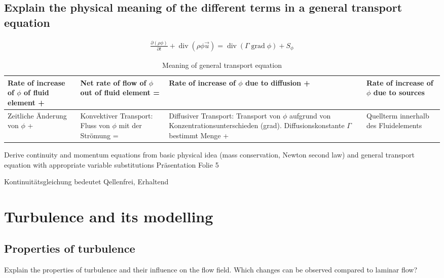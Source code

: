 \documentclass[a4paper]{scrartcl}
\begin{document}
\subsection{Explain the physical meaning of the different terms in a general
transport equation}

\begin{align}
\frac{\partial(\rho \phi)}{\partial t} + \operatorname{div}(\rho\phi\vec
u)=\operatorname{div}(\Gamma \operatorname{grad} \phi) + S_\phi
\end{align}

\begin{table}[h]
\begin{center}
\begin{tabular}{|p{3cm}|p{3cm}|p{3cm}|p{3cm}|}
\hline Rate of increase of $\phi$ of fluid element +& Net rate of flow of $\phi$
out of fluid element =& Rate of increase of $\phi$ due to diffusion +& Rate of
increase of $\phi$ due to sources \\
\hline Zeitliche Änderung von $\phi$  +& Konvektiver Transport: Fluss von $\phi$
mit der Strömung =& Diffusiver Transport: Transport von $\phi$ aufgrund von
Konzentrationsunterschieden (grad). Diffusionskonstante $\Gamma$ bestimmt Menge
+& Quellterm innerhalb des Fluidelements \\
\hline
\end{tabular}
\caption{Meaning of general transport equation}
\end{center}
\end{table}

Derive continuity and momentum equations from basic physical idea (mass conservation, Newton second law) and general transport equation with appropriate variable substitutions
Präsentation Folie 5

Kontinuitätsgleichung bedeutet Qellenfrei, Erhaltend





\section{Turbulence and its modelling}

\subsection{Properties of turbulence}
Explain the properties of turbulence and their influence on the flow
field. Which changes can be observed compared to laminar flow?
\end{document}
